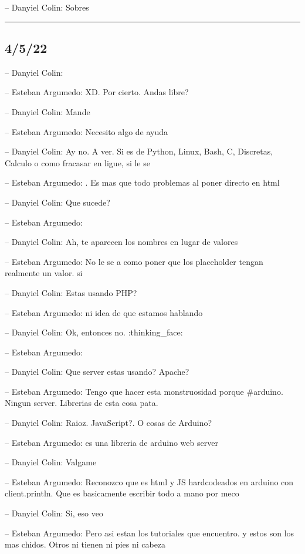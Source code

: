 -- Danyiel Colin: Sobres

\begin{center}\rule{0.5\linewidth}{0.5pt}\end{center}

\hypertarget{section-49}{%
\subsection{4/5/22}\label{section-49}}

-- Danyiel Colin:

-- Esteban Argumedo: XD. Por cierto. Andas libre?

-- Danyiel Colin: Mande

-- Esteban Argumedo: Necesito algo de ayuda

-- Danyiel Colin: Ay no. A ver. Si es de Python, Linux, Bash, C,
Discretas, Calculo o como fracasar en ligue, si le se

-- Esteban Argumedo: . Es mas que todo problemas al poner directo en
html

-- Danyiel Colin: Que sucede?

-- Esteban Argumedo:

-- Danyiel Colin: Ah, te aparecen los nombres en lugar de valores

-- Esteban Argumedo: No le se a como poner que los placeholder tengan
realmente un valor. si

-- Danyiel Colin: Estas usando PHP?

-- Esteban Argumedo: ni idea de que estamos hablando

-- Danyiel Colin: Ok, entonces no. :thinking\_face:

-- Esteban Argumedo:

-- Danyiel Colin: Que server estas usando? Apache?

-- Esteban Argumedo: Tengo que hacer esta monstruosidad porque
\#arduino. Ningun server. Librerias de esta cosa pata.

-- Danyiel Colin: Raioz. JavaScript?. O cosas de Arduino?

-- Esteban Argumedo: es una libreria de arduino web server

-- Danyiel Colin: Valgame

-- Esteban Argumedo: Reconozco que es html y JS hardcodeados en arduino
con client.println. Que es basicamente escribir todo a mano por meco

-- Danyiel Colin: Si, eso veo

-- Esteban Argumedo: Pero asi estan los tutoriales que encuentro. y
estos son los mas chidos. Otros ni tienen ni pies ni cabeza

